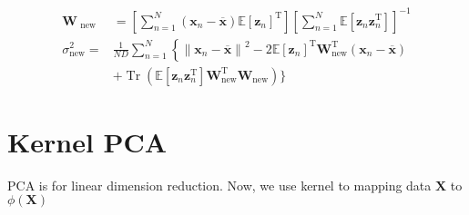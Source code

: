 \documentclass{article}
\begin{document}
\begin{equation}
\begin{aligned} \mathbf{W}_{\text { new }} &=\left[\sum_{n=1}^{N}\left(\mathbf{x}_{n}-\overline{\mathbf{x}}\right) \mathbb{E}\left[\mathbf{z}_{n}\right]^{\mathrm{T}}\right]\left[\sum_{n=1}^{N} \mathbb{E}\left[\mathbf{z}_{n} \mathbf{z}_{n}^{\mathrm{T}}\right]\right]^{-1} \\ \sigma_{\mathrm{new}}^{2}=& \frac{1}{N D} \sum_{n=1}^{N}\left\{\left\|\mathbf{x}_{n}-\overline{\mathbf{x}}\right\|^{2}-2 \mathbb{E}\left[\mathbf{z}_{n}\right]^{\mathrm{T}} \mathbf{W}_{\mathrm{new}}^{\mathrm{T}}\left(\mathbf{x}_{n}-\overline{\mathbf{x}}\right)\right.\\ &+\operatorname{Tr}\left(\mathbb{E}\left[\mathbf{z}_{n} \mathbf{z}_{n}^{\mathrm{T}}\right] \mathbf{W}_{\mathrm{new}}^{\mathrm{T}} \mathbf{W}_{\mathrm{new}}\right) \} \end{aligned}
\end{equation}

\section{Kernel PCA}
PCA is for linear dimension reduction. Now, we use kernel to mapping data $\mathbf{X}$ to $\phi(\mathbf{X})$
\end{document}
